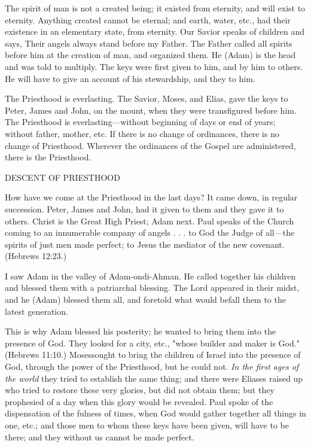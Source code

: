 The spirit of man is not a created being; it existed from eternity, and will exist to eternity.
Anything created cannot be eternal; and earth, water, etc., had their existence in an
elementary state, from eternity. Our Savior speaks of children and says, Their angels always
stand before my Father. The Father called all spirits before him at the creation of man, and
organized them. He (Adam) is the head and was told to multiply. The keys were first given to
him, and by him to others. He will have to give an account of his stewardship, and they to
him.

The Priesthood is everlasting. The Savior, Moses, and Elias, gave the keys to Peter, James
and John, on the mount, when they were transfigured before him. The Priesthood is
everlasting—without beginning of days or end of years; without father, mother, etc. If there
is no change of ordinances, there is no change of Priesthood. Wherever the ordinances of the
Gospel are administered, there is the Priesthood.

DESCENT OF PRIESTHOOD

How have we come at the Priesthood in the last days? It came down, in regular succession.
Peter, James and John, had it given to them and they gave it to others. Christ is the Great
High Priest; Adam next. Paul speaks of the Church coming to an innumerable company of
angels . . . to God the Judge of all—the spirits of just men made perfect; to Jesus the mediator
of the new covenant. (Hebrews 12:23.)

I saw Adam in the valley of Adam-ondi-Ahman. He called together his children and blessed
them with a patriarchal blessing. The Lord appeared in their midst, and he (Adam) blessed
them all, and foretold what would befall them to the latest generation.

This is why Adam blessed his posterity; he wanted to bring them into the presence of God.
They looked for a city, etc., "whose builder and maker is God." (Hebrews 11:10.) Mosessought to bring the children of Israel into the presence of God, through the power of the
Priesthood, but he could not. \textit{In the first ages of the world} they tried to establish the same
thing; and there were Eliases raised up who tried to restore these very glories, but did not
obtain them; but they prophesied of a day when this glory would be revealed. Paul spoke of
the dispensation of the fulness of times, when God would gather together all things in one,
etc.; and those men to whom these keys have been given, will have to be there; and they
without us cannot be made perfect.

